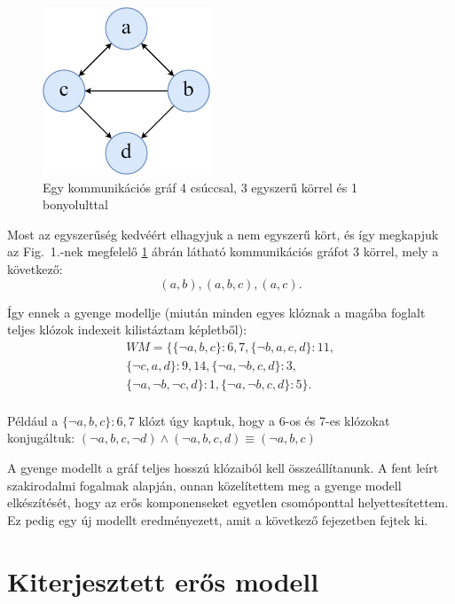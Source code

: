 \documentclass[
]{thesis-ekf}
\theoremstyle{definition}
\theoremstyle{remark}
\begin{document}
	\begin{figure}[ht]
		\centering
		\includegraphics[width=5cm]{images/SYNASC2020_4node_7edge}
		\caption{Egy kommunikációs gráf 4 csúccsal, 3 egyszerű körrel és 1 bonyolulttal}
		\label{abra-synasc2020-4node7edge}
	\end{figure}

	Most az egyszerűség kedvéért elhagyjuk a nem egyszerű kört, és így megkapjuk az Fig.~1.-nek megfelelő \ref{abra-synasc2020-4node7edge} ábrán látható kommunikációs gráfot 3 körrel, mely a következő:
	\[ (a,b),(a,b,c),(a,c). \]
	
	Így ennek a gyenge modellje (miután minden egyes klóznak a magába foglalt teljes klózok indexeit kilistáztam \az{\eqref{eq-teljes-klozok}} képletből):
	\begin{equation*}
		\begin{split}
			WM=\{\{\neg a,b,c\} :6,7,\{\neg b,a,c,d\} :11, \\
			\{\neg c,a,d\} :9,14,\{\neg a,\neg b,c,d\} :3, \\
			\{\neg a,\neg b,\neg c,d\} :1,\{\neg a,\neg b,c,d\} :5\}. \\
		\end{split}
	\end{equation*}

	Például a $ \{\neg a,b,c\} :6,7 $ klózt úgy kaptuk, hogy a 6-os és 7-es klózokat konjugáltuk:
	$ (\neg a,b,c,\neg d)\wedge(\neg a,b,c,d)\equiv(\neg a,b,c) $
		
	A gyenge modellt a gráf teljes hosszú klózaiból kell összeállítanunk. A fent leírt szakirodalmi fogalmak alapján, onnan közelítettem meg a gyenge modell elkészítését, hogy az erős komponenseket egyetlen csomóponttal helyettesítettem. Ez pedig egy új modellt eredményezett, amit a következő fejezetben fejtek ki.
	
	\section{Kiterjesztett erős modell}\label{sec-esm}
\end{document}
